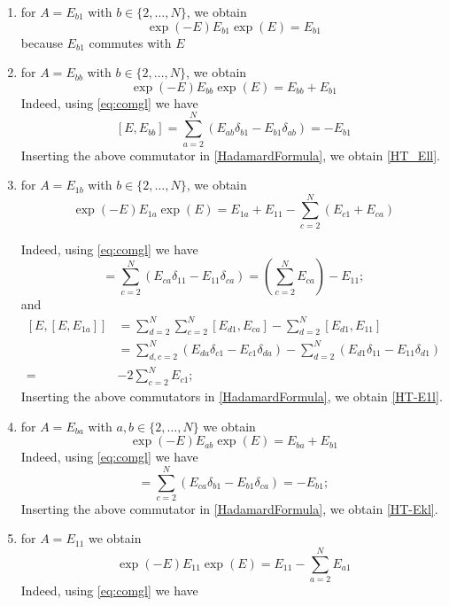\documentclass[10pt]{article}
\numberwithin{equation}{section}
\numberwithin{equation}{subsection}
\newcommand{\com}[1]{{ (* {\color{red}\small #1}*)}}
\begin{document}
\begin{enumerate}
    \item for $A=E_{b 1}$ with $b\in \{2,\ldots,N\}$, we obtain 
    \begin{equation}\label{HT_El1}
        \exp{(-E)}E_{b 1}\exp{(E)}=E_{b 1}
    \end{equation}
    because $E_{b 1}$ commutes with $E$
    \item for $A=E_{bb}$ with $b \in \{2,\ldots,N\}$, we obtain 
    \begin{equation}\label{HT_Ell}
        \exp{(-E)}E_{b b}\exp{(E)}=E_{b b}+E_{b 1}
    \end{equation}
Indeed, using \eqref{eq:comgl} we have 
    \begin{equation}
       \left[E, E_{bb}\right]=\sum_{a=2}^{N}\left(E_{ab}\delta_{b 1}-E_{b 1}\delta_{ab}\right)=-E_{b1}
    \end{equation}
    Inserting the above commutator in \eqref{HadamardFormula}, we obtain \eqref{HT_Ell}.
    \item for $A=E_{1b}$ with $b\in \{2,\ldots,N\}$, we obtain 
    \begin{equation}\label{HT-E1l}
        \exp{(-E)}E_{1 a}\exp{(E)}=E_{1a}+E_{11}-\sum_{c=2}^{N}\left(E_{c1}+E_{ca}\right)
    \end{equation}
    
    Indeed, using \eqref{eq:comgl} we have 
    \begin{equation}
[E,E_{1a}]=\sum_{c=2}^{N}\left(E_{ca}\delta_{11}-E_{11}\delta_{ca}\right)= (\sum_{c=2}^{N}E_{ca} ) -E_{11};
\end{equation}
and 
\begin{equation}
\begin{split}
\left[E,[E,E_{1a}]\right]&=\sum_{d=2}^{N}\sum_{c=2}^{N}\left[E_{d1},E_{ca}\right]-\sum_{d=2}^{N}\left[E_{d1},E_{11}\right]
\\&=
\sum_{d,c=2}^{N}\left(E_{da}\delta_{c1}-E_{c1}\delta_{da}\right)-\sum_{d=2}^{N}\left(E_{d1}\delta_{11}-E_{11}\delta_{d1}\right)
\\=&
-2\sum_{c=2}^{N}E_{c1};
\end{split}
\end{equation}
Inserting the above commutators in \eqref{HadamardFormula}, we obtain \eqref{HT-E1l}.
\item for $A=E_{ba}$ with $a,b \in \{2,\ldots,N\}$ we obtain 
\begin{equation}\label{HT-Ekl}
    \exp{(-E)}E_{a b}\exp{(E)}=E_{ba}+E_{b1}
\end{equation}
   Indeed, using \eqref{eq:comgl} we have 
\begin{equation}
[E,E_{ba}]=\sum_{c=2}^{N}\left(E_{ca}\delta_{b1}-E_{b1}\delta_{c a}\right)=-E_{b1};
\end{equation}
Inserting the above commutator in \eqref{HadamardFormula}, we obtain \eqref{HT-Ekl}.
\item for $A=E_{11}$ we obtain 
\begin{equation}\label{HT-E11}
    \exp{(-E)}E_{11}\exp{(E)}=E_{11}-\sum_{a=2}^{N}E_{a1}
\end{equation}
  Indeed, using \eqref{eq:comgl} we have 


\end{enumerate}
\end{document}

